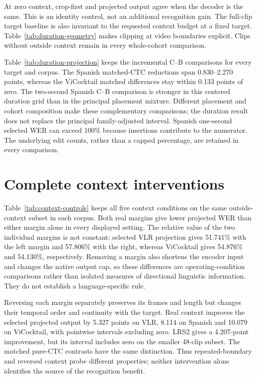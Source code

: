 At zero context, crop-first and projected output agree when the decoder is
the same. This is an identity control, not an additional recognition gain.
The full-clip target baseline is also invariant to the requested context
budget at a fixed target. Table~\ref{tab:duration-geometry} makes clipping
at video boundaries explicit. Clips without outside context remain in every
whole-cohort comparison.

Table~\ref{tab:duration-projection} keeps the incremental C--B comparisons
for every target and corpus. The Spanish matched-CTC reductions span
0.830--2.270 points, whereas the ViCocktail matched differences stay within
0.133 points of zero. The two-second Spanish C--B comparison is stronger in
this centered duration grid than in the principal placement mixture. Different
placement and cohort composition make these complementary comparisons;
the duration result does not replace the principal family-adjusted interval.
Spanish one-second selected WER can exceed 100\% because insertions contribute
to the numerator. The underlying edit counts, rather than a capped percentage,
are retained in every comparison.

\section{Complete context interventions}
\label{app:context-controls}

Table~\ref{tab:context-controls} keeps all five context conditions on the same
outside-context subset in each corpus. Both real margins give lower projected
WER than either margin alone in every displayed setting. The relative value
of the two individual margins is not constant: selected VLR projection gives
51.741\% with the left margin and 57.806\% with the right, whereas ViCocktail
gives 54.876\% and 54.130\%, respectively. Removing a margin also shortens the
encoder input and changes the native output cap, so these differences are
operating-condition comparisons rather than isolated measures of directional
linguistic information. They do not establish a language-specific rule.

Reversing each margin separately preserves its frames and length but changes
their temporal order and continuity with the target. Real context improves
the selected projected output by 5.327 points on VLR, 8.114 on Spanish and
10.079 on ViCocktail, with pointwise intervals excluding zero. LRS2 gives a
4.207-point improvement, but its interval includes zero on the smaller
48-clip subset. The matched pure-CTC contrasts have the same distinction.
Thus repeated-boundary and reversed context probe different properties;
neither intervention alone identifies the source of the recognition benefit.

